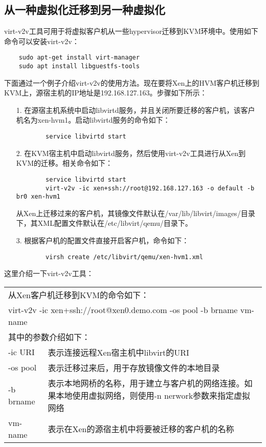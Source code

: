 \documentclass[a4paper,left=2.5cm,right=2.5cm,11pt]{article}
\newcommand{\interval}{\vspace{0.5em}}
\begin{document}
\subsection{从一种虚拟化迁移到另一种虚拟化}
	virt-v2v工具可用于将虚拟客户机从一些hypervisor迁移到KVM环境中。使用如下命令可以安装virt-v2v：
	\begin{lstlisting}
	sudo apt-get install virt-manager
	sudo apt install libguestfs-tools
	\end{lstlisting}

	下面通过一个例子介绍virt-v2v的使用方法。现在要将Xen上的HVM客户机迁移到KVM上，源宿主机的IP地址是192.168.127.163。步骤如下所示：
	\begin{itemize}
		\item[1.] 在源宿主机系统中启动libvirtd服务，并且关闭所要迁移的客户机，该客户机名为xen-hvm1。启动libvirtd服务的命令如下：
		\begin{lstlisting}
		service libvirtd start
		\end{lstlisting}

		\item[2.] 在KVM宿主机中启动libvirtd服务，然后使用virt-v2v工具进行从Xen到KVM的迁移。相关命令如下：
		\begin{lstlisting}
		service libvirtd start
		virt-v2v -ic xen+ssh://root@192.168.127.163 -o default -b br0 xen-hvm1
		\end{lstlisting}

		从Xen上迁移过来的客户机，其镜像文件默认在/var/lib/libvirt/images/目录下，其XML配置文件默认在/etc/libvirt/qemu/目录下。

		\item[3.] 根据客户机的配置文件直接开启客户机，命令如下：
		\begin{lstlisting}
		virsh create /etc/libvirt/qemu/xen-hvm1.xml
		\end{lstlisting}
	\end{itemize}

	这里介绍一下virt-v2v工具：
	\interval
	\begin{longtable}{p{3cm}p{10cm}}
	\hline
	\multicolumn{2}{l}{从Xen客户机迁移到KVM的命令如下：} \\
	\multicolumn{2}{l}{virt-v2v -ic xen+ssh://root@xen0.demo.com -os pool -b brname vm-name} \\
	\hline
	\multicolumn{2}{l}{其中的参数介绍如下：} \\
	\hline
	-ic URI & 表示连接远程Xen宿主机中libvirt的URI \\
	\hline
	-os pool & 表示迁移过来后，用于存放镜像文件的本地目录 \\
	\hline
	-b brname & 表示本地网桥的名称，用于建立与客户机的网络连接。如果本地使用虚拟网络，则使用-n nerwork参数来指定虚拟网络 \\
	\hline
	vm-name & 表示在Xen的源宿主机中将要被迁移的客户机的名称 \\
	\hline
	\end{longtable}
\end{document}
